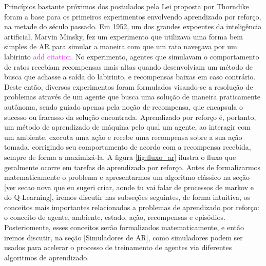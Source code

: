 \documentclass[cic,tc]{iiufrgs}
\newcommand\bruno[1]{\textcolor{magenta}{#1}}
\begin{document}
Princípios bastante próximos dos postulados pela Lei proposta por Thorndike foram a base para os primeiros experimentos
envolvendo aprendizado por reforço, na metade do século passado. Em 1952, um dos grandes expoentes da inteligência artificial,
Marvin Minsky, fez um experimento que utilizava uma forma bem simples de AR para simular a maneira com que um rato
%
%
navegava por um labirinto \bruno{add citation}. No experimento, agentes que simulavam o comportamento de ratos recebiam recompensas mais altas quando desenvolviam um
método de busca que achasse a saída do labirinto, e recompensas baixas em caso contrário.
Deste então, diversos experimentos foram formulados visando-se a resolução de problemas através de um agente que busca uma solução
de maneira praticamente autônoma, sendo guiado apenas pela noção de recompensa, que encapsula o sucesso ou fracasso da solução encontrada.
Aprendizado por reforço é, portanto, um método de aprendizado de máquina pelo qual um agente, ao interagir com um ambiente,
executa uma ação e recebe uma recompensa sobre a sua ação tomada, corrigindo seu comportamento de acordo com a recompensa recebida,
sempre de forma a maximizá-la.
A figura \ref{fig:fluxo_ar} ilustra o fluxo que geralmente ocorre em tarefas de aprendizado por reforço.
 Antes de formalizarmos matematicamente o
problema e apresentarmos um algoritmo clássico na seção [ver secao nova que eu sugeri criar, aonde tu vai falar de processos de
markov e do Q-Learning], iremos discutir nas subseções seguintes, de forma intuitiva, os conceitos mais importantes relacionados a problemas de aprendizado
por reforço: o conceito de agente, ambiente, estado, ação, recompensas e episódios. Posteriomente, esses conceitos serão formalizados matematicamente, e então
iremos discutir, na seção [Simuladores de AR], como simuladores podem ser usados para acelerar o processo de treinamento de agentes via
diferentes algoritmos de aprendizado.
\end{document}

